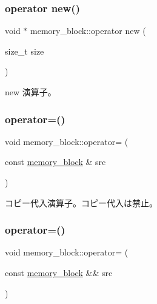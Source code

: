 \subsubsection{\texorpdfstring{operator new()}{operator new()}}
{\footnotesize\ttfamily void $\ast$ memory\+\_\+block\+::operator new (\begin{DoxyParamCaption}\item[{size\+\_\+t}]{size }\end{DoxyParamCaption})\hspace{0.3cm}{\ttfamily [static]}}

new 演算子。 \hypertarget{classmemory__block_ae6f96e210fcddb0390b69ebf544100dc}{}\label{classmemory__block_ae6f96e210fcddb0390b69ebf544100dc} 
\subsubsection{\texorpdfstring{operator=()}{operator=()}\hspace{0.1cm}{\footnotesize\ttfamily [1/2]}}
{\footnotesize\ttfamily void memory\+\_\+block\+::operator= (\begin{DoxyParamCaption}\item[{const \hyperlink{classmemory__block}{memory\+\_\+block} \&}]{src }\end{DoxyParamCaption})\hspace{0.3cm}{\ttfamily [delete]}}

コピー代入演算子。コピー代入は禁止。 \hypertarget{classmemory__block_a192afb96e0361d057f0933119d42dc6f}{}\label{classmemory__block_a192afb96e0361d057f0933119d42dc6f} 
\subsubsection{\texorpdfstring{operator=()}{operator=()}\hspace{0.1cm}{\footnotesize\ttfamily [2/2]}}
{\footnotesize\ttfamily void memory\+\_\+block\+::operator= (\begin{DoxyParamCaption}\item[{const \hyperlink{classmemory__block}{memory\+\_\+block} \&\&}]{src }\end{DoxyParamCaption})\hspace{0.3cm}{\ttfamily [delete]}}

